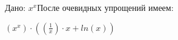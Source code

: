 \documentclass{article}
\begin{document}
Дано: ${x}^{x}$\bigskip После очевидных упрощений имеем:

$({x}^{x}) \cdot ((\frac{1}{x}) \cdot x + ln(x))$
\end{document}
